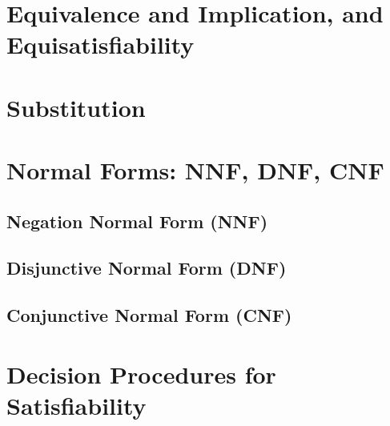 
\section{Equivalence and Implication, and Equisatisfiability}

\section{Substitution}

\section{Normal Forms: NNF, DNF, CNF}

\subsection{Negation Normal Form (NNF)}
\subsection{Disjunctive Normal Form (DNF)}
\subsection{Conjunctive Normal Form (CNF)}

\section{Decision Procedures for Satisfiability}

%
%
%

